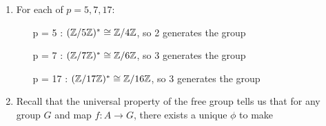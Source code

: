 \documentclass[12pt, twosided]{article}
\begin{document}
\begin{enumerate}
\begin{proof}
    \begin{center}
    \end{center}
    So notice that we get that the projections which allow us to factor through \(\phi\) are \(\pi_{A} \circ \pi_{A, B}\), \(\pi_B \circ \pi_{A, B}\), and \(\pi_C\). Then this diagram commutes and haas the universal property of the triple product that I have asserted.
  \end{proof}
\item For each of \(p = 5, 7, 17\):
  \begin{itemize}
  \item [p = 5]: \((\mathbb{Z} / 5\mathbb{Z})^* \cong \mathbb{Z}/4\mathbb{Z}\), so 2 generates the group
  \item [p = 7]: \((\mathbb{Z} / 7\mathbb{Z})^* \cong \mathbb{Z}/6\mathbb{Z}\), so 3 generates the group
  \item [p = 17]: \((\mathbb{Z} / 17\mathbb{Z})^* \cong \mathbb{Z}/16\mathbb{Z}\), so 3 generates the group
  \end{itemize}
\item Recall that the universal property of the free group tells us that for any group \(G\) and map \(f: A \to G\), there exists a unique \(\phi\) to make


\end{enumerate}
\end{document}

